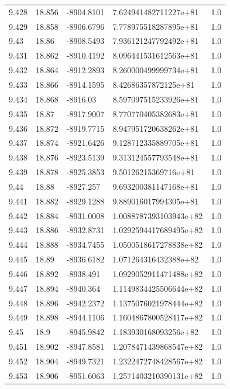 \begin{tabular}{lllll}
9.428 & 18.856 & -8904.8101 & 7.624941482711227e+81 & 1.0 \\
9.429 & 18.858 & -8906.6796 & 7.778975518287895e+81 & 1.0 \\
9.43 & 18.86 & -8908.5493 & 7.936121247792492e+81 & 1.0 \\
9.431 & 18.862 & -8910.4192 & 8.096441531612563e+81 & 1.0 \\
9.432 & 18.864 & -8912.2893 & 8.260000499999734e+81 & 1.0 \\
9.433 & 18.866 & -8914.1595 & 8.42686357872125e+81 & 1.0 \\
9.434 & 18.868 & -8916.03 & 8.597097515233926e+81 & 1.0 \\
9.435 & 18.87 & -8917.9007 & 8.770770405382683e+81 & 1.0 \\
9.436 & 18.872 & -8919.7715 & 8.947951720638262e+81 & 1.0 \\
9.437 & 18.874 & -8921.6426 & 9.128712335889705e+81 & 1.0 \\
9.438 & 18.876 & -8923.5139 & 9.313124557793548e+81 & 1.0 \\
9.439 & 18.878 & -8925.3853 & 9.50126215369716e+81 & 1.0 \\
9.44 & 18.88 & -8927.257 & 9.693200381147168e+81 & 1.0 \\
9.441 & 18.882 & -8929.1288 & 9.889016017994305e+81 & 1.0 \\
9.442 & 18.884 & -8931.0008 & 1.0088787393103943e+82 & 1.0 \\
9.443 & 18.886 & -8932.8731 & 1.0292594417689495e+82 & 1.0 \\
9.444 & 18.888 & -8934.7455 & 1.0500518617278838e+82 & 1.0 \\
9.445 & 18.89 & -8936.6182 & 1.071264316432388e+82 & 1.0 \\
9.446 & 18.892 & -8938.491 & 1.0929052911471488e+82 & 1.0 \\
9.447 & 18.894 & -8940.364 & 1.1149834425506644e+82 & 1.0 \\
9.448 & 18.896 & -8942.2372 & 1.1375076021978444e+82 & 1.0 \\
9.449 & 18.898 & -8944.1106 & 1.1604867800528417e+82 & 1.0 \\
9.45 & 18.9 & -8945.9842 & 1.183930168093256e+82 & 1.0 \\
9.451 & 18.902 & -8947.8581 & 1.2078471439868547e+82 & 1.0 \\
9.452 & 18.904 & -8949.7321 & 1.2322472748428567e+82 & 1.0 \\
9.453 & 18.906 & -8951.6063 & 1.2571403210390131e+82 & 1.0 \\

\end{tabular}
